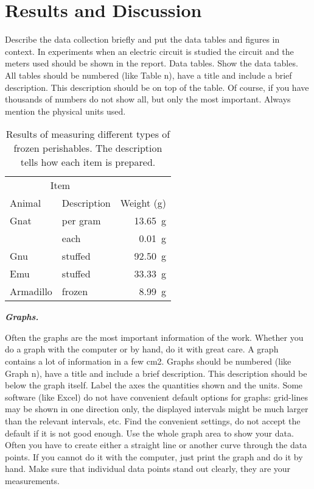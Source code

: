 \documentclass{scrartcl}
\begin{document}
\section{Results and Discussion} %

Describe the data collection briefly and put the data tables and figures in context.
In experiments when an electric circuit is studied the circuit and the meters used should be shown in the report.
Data tables.
Show the data tables.
All tables should be numbered (like Table n), have a title and include a brief description.
This description should be on top of the table. Of course, if you have thousands of numbers do not show all, but only the most important.
Always mention the physical units used.

\begin{table}[ht] %
    \centering
    \begin{tabular}{llr} %
\hline
\multicolumn{2}{c}{Item} \\ %
\cline{1-2}
Animal    & Description & Weight (\si{\gram}) \\
\hline %
Gnat      & per gram    & \SI{13.65}{\gram}      \\ %
          & each        & \SI{0.01}{\gram}       \\ %
Gnu       & stuffed     & \SI{92.50}{\gram}      \\
Emu       & stuffed     & \SI{33.33}{\gram}      \\
Armadillo & frozen      & \SI{8.99}{\gram}       \\
\hline
\end{tabular}
    \caption{Results of measuring different types of frozen perishables.
    The description tells how each item is prepared.}
    \label{tab:my_label}
\end{table}

\textbf{\textit{Graphs.}} 

Often the graphs are the most important information of the work.
Whether you do a graph with the computer or by hand, do it with great care.
A graph contains a lot of information in a few cm2.
Graphs should be numbered (like Graph n), have a title and include a brief description.
This description should be below the graph itself. Label the axes the quantities shown and the units.
Some software (like Excel) do not have convenient default options for graphs:
grid-lines may be shown in one direction only, the displayed intervals might be much larger than the relevant intervals, etc. 
Find the convenient settings, do not accept the default if it is not good enough.
Use the whole graph area to show your data. Often you have to create either a straight line or another curve through the data points.
If you cannot do it with the computer, just print the graph and do it by hand.
Make sure that individual data points stand out clearly, they are your measurements.
\end{document}
